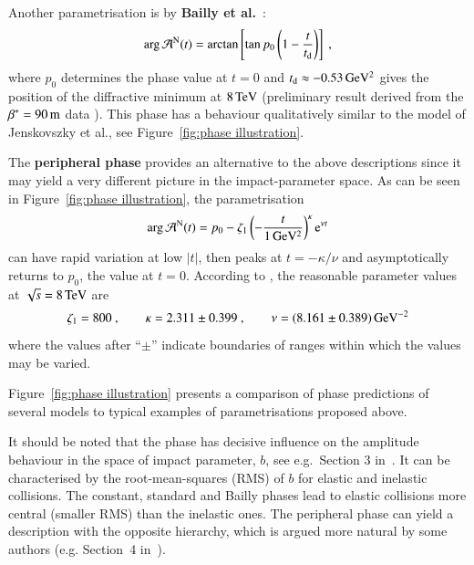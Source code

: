Another parametrisation is by {\bf Bailly et al.}~\cite{bailly87}:
\begin{equation}
\label{eq:nuc phase bai}
	\arg {\cal A}^{\rm N}(t) = \arctan \left[ \tan p_0 \left(1 - {t\over t_{\rm d}} \right) \right]\ ,
\end{equation}
where $p_0$ determines the phase value at $t=0$ and $t_{\rm d} \approx -0.53\,{\rm GeV^2}$ gives the position of the diffractive minimum at $8\,{\rm TeV}$ (preliminary result derived from the $\beta^* = 90\,{\rm m}$ data \cite{8tev-90m}). This phase has a behaviour qualitatively similar to the model of Jenskovszky et al., see Figure~\ref{fig:phase illustration}.

The {\bf peripheral phase} \cite{kl94} provides an alternative to the above descriptions since it may yield a very different picture in the impact-parameter space. As can be seen in Figure~\ref{fig:phase illustration}, the parametrisation
\begin{equation}
\label{eq:nuc phase per}
\arg {\cal A}^{\rm N}(t) = p_0 - \zeta_1 \left(- {t\over 1\un{GeV^2}} \right)^\kappa \e^{\nu t}
\end{equation}
can have rapid variation at low $|t|$, then peaks at $t = -\kappa / \nu$ and asymptotically returns to $p_0$, the value at $t=0$. According to \cite{kl-8tev}, the reasonable parameter values at $\sqrt s = 8\,{\rm TeV}$ are
\begin{equation}
\label{eq:nuc phase per val}
	\zeta_1 = 800\ ,\qquad
	\kappa = 2.311 \pm 0.399\ ,\qquad
	\nu = (8.161 \pm 0.389)\,{\rm GeV^{-2}}
\end{equation}
where the values after ``$\pm$'' indicate boundaries of ranges within which the values may be varied.


Figure~\ref{fig:phase illustration} presents a comparison of phase predictions of several models to typical examples of parametrisations proposed above.

  It should be noted that the phase has decisive influence on the amplitude behaviour in the space of impact parameter, $b$, see e.g.~Section 3 in~\cite{klk02}. It can be characterised by the root-mean-squares (RMS) of $b$ for elastic and inelastic collisions. The constant, standard and Bailly phases lead to elastic collisions more central (smaller RMS) than the inelastic ones. The peripheral phase can yield a description with the opposite hierarchy, which is argued more natural by some authors (e.g. Section~4 in~\cite{kl96}).

